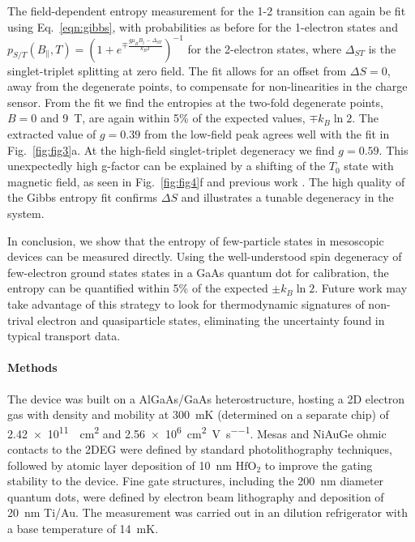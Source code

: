 \documentclass[twocolumn,showpacs,amsmath,amssymb,prl,aps,superscriptaddress]{revtex4-1}
\begin{document}
The field-dependent entropy measurement for the 1-2 transition can again be fit using Eq.~\ref{eqn:gibbs}, with probabilities as before for the 1-electron states and $p_{S/T}(B_\parallel, T) = (1+ e^{\mp \frac{g\mu_B B_\parallel - \Delta_{ST}}{k_B T}})^{-1}$ for the 2-electron states, where $\Delta_{ST}$ is the singlet-triplet splitting at zero field. The fit allows for an offset from $\Delta S=0$, away from the degenerate points, to compensate for non-linearities in the charge sensor. From the fit we find the entropies at the two-fold degenerate points, $B=0$ and \SI{9}{\tesla}, are again within 5\% of the expected values, $\mp k_B \ln{2}$. The extracted value of $g = 0.39$ from the low-field peak agrees well with the fit in Fig.~\ref{fig:fig3}a. At the high-field singlet-triplet degeneracy we find $g = 0.59$. This unexpectedly high g-factor can be explained by a shifting of the $T_{0}$ state with magnetic field, as seen in Fig.~\ref{fig:fig4}f and previous work \cite{Szafran2004}. The high quality of the Gibbs entropy fit confirms $\Delta S$ and illustrates a tunable degeneracy in the system.

In conclusion, we show that the entropy of few-particle states in mesoscopic devices can be measured directly.  Using the well-understood spin degeneracy of  few-electron ground states states in a GaAs quantum dot for calibration, the entropy can be quantified within 5\% of the expected $\pm k_B\ln{2}$.  Future work may take advantage of this strategy to look for thermodynamic signatures of non-trival electron and quasiparticle states, eliminating the uncertainty found in typical transport data.

\paragraph*{Methods} The device was built on a AlGaAs/GaAs heterostructure, hosting a 2D electron gas with density and mobility at \SI{300}{\milli\kelvin} (determined on a separate chip) of \SI{2.42e11}{\per\square\centi\metre} and \SI[per-mode=symbol]{2.56e6}{\square\centi\metre\per\volt\per\second}.   Mesas and NiAuGe ohmic contacts to the 2DEG were defined by standard photolithography techniques, followed by atomic layer deposition of \SI{10}{\nano\metre} $\mathrm{HfO_2}$ to improve the gating stability to the device. Fine gate structures, including the \SI{200}{\nano\metre} diameter quantum dots, were defined by electron beam lithography and deposition of \SI{20}{\nano\metre} Ti/Au. The measurement was carried out in an dilution refrigerator with a base temperature of \SI{14}{\milli\kelvin}.
\end{document}

